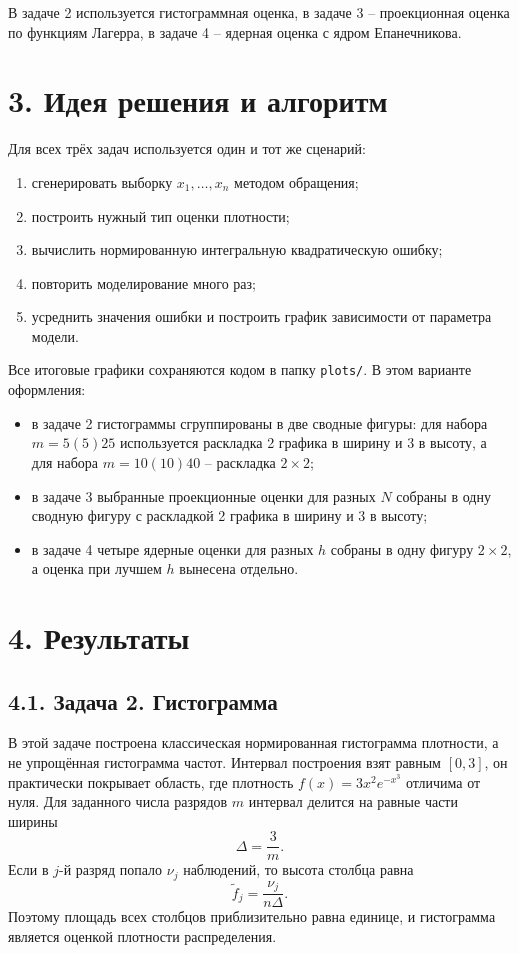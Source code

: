 \documentclass[12pt,a4paper]{article}
\begin{document}
В задаче 2 используется гистограммная оценка,
в задаче 3 -- проекционная оценка по функциям Лагерра,
в задаче 4 -- ядерная оценка с ядром Епанечникова.

\section*{3. Идея решения и алгоритм}

Для всех трёх задач используется один и тот же сценарий:
\begin{enumerate}
    \item сгенерировать выборку $x_1,\dots,x_n$ методом обращения;
    \item построить нужный тип оценки плотности;
    \item вычислить нормированную интегральную квадратическую ошибку;
    \item повторить моделирование много раз;
    \item усреднить значения ошибки и построить график зависимости от параметра модели.
\end{enumerate}

Все итоговые графики сохраняются кодом в папку \texttt{plots/}. В этом варианте оформления:
\begin{itemize}
    \item в задаче 2 гистограммы сгруппированы в две сводные фигуры: для набора $m=5(5)25$ используется раскладка 2 графика в ширину и 3 в высоту, а для набора $m=10(10)40$ -- раскладка $2\times 2$;
    \item в задаче 3 выбранные проекционные оценки для разных $N$ собраны в одну сводную фигуру с раскладкой 2 графика в ширину и 3 в высоту;
    \item в задаче 4 четыре ядерные оценки для разных $h$ собраны в одну фигуру $2\times 2$, а оценка при лучшем $h$ вынесена отдельно.
\end{itemize}

\section*{4. Результаты}

\subsection*{4.1. Задача 2. Гистограмма}

В этой задаче построена классическая нормированная гистограмма плотности, а не
упрощённая гистограмма частот. Интервал построения взят равным $[0,3]$, он
практически покрывает область, где плотность $f(x)=3x^2e^{-x^3}$ отличима от
нуля. Для заданного числа разрядов $m$ интервал делится на равные части
ширины
\[
\Delta=\frac{3}{m}.
\]
Если в $j$-й разряд попало $\nu_j$ наблюдений, то высота столбца равна
\[
\widetilde f_j=\frac{\nu_j}{n\Delta}.
\]
Поэтому площадь всех столбцов приблизительно равна единице, и гистограмма
является оценкой плотности распределения.
\end{document}
